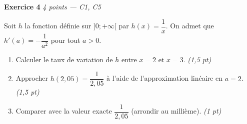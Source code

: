 \bigskip

\textbf{Exercice 4} \hfill \textit{4 points — C1, C5}

Soit $h$ la fonction définie sur $]0;+\infty[$ par $h(x) = \dfrac{1}{x}$. On admet que $h'(a) = -\dfrac{1}{a^2}$ pour tout $a > 0$.

\begin{enumerate}
  \item Calculer le taux de variation de $h$ entre $x=2$ et $x=3$. \hfill \textit{(1,5 pt)}
  \item Approcher $h(2{,}05) = \dfrac{1}{2{,}05}$ à l'aide de l'approximation linéaire en $a=2$. \hfill \textit{(1,5 pt)}
  \item Comparer avec la valeur exacte $\dfrac{1}{2{,}05}$ (arrondir au millième). \hfill \textit{(1 pt)}
\end{enumerate}

